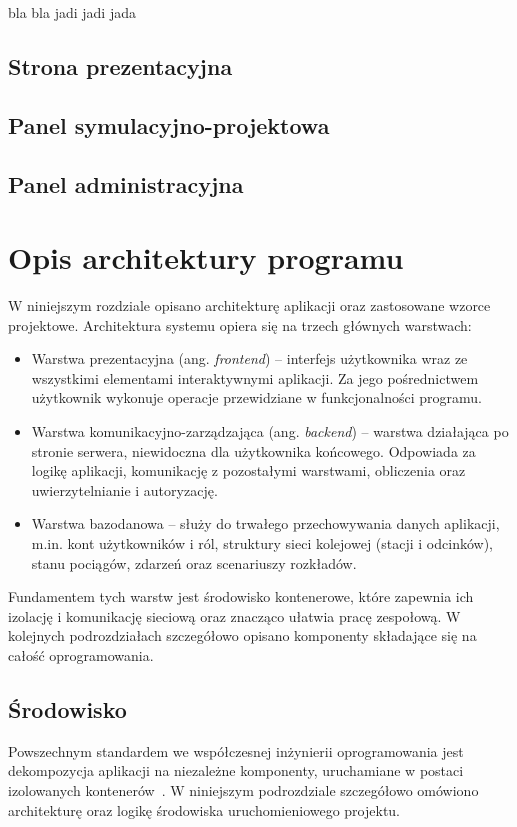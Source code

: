 \documentclass[twoside]{projektInzynierskiMS1z}
\begin{document}
bla bla jadi jadi jada
\subsection{Strona prezentacyjna} 
\subsection{Panel symulacyjno-projektowa}
\subsection{Panel administracyjna}

\section{Opis architektury programu}
W niniejszym rozdziale opisano architekturę aplikacji oraz zastosowane wzorce
projektowe. Architektura systemu opiera się na trzech głównych warstwach:
\begin{itemize}
    \item Warstwa prezentacyjna (ang. \emph{frontend}) -- interfejs użytkownika
    wraz ze wszystkimi elementami interaktywnymi aplikacji. Za jego
    pośrednictwem użytkownik wykonuje operacje przewidziane w funkcjonalności
    programu.
    \item Warstwa komunikacyjno-zarządzająca (ang. \emph{backend}) -- warstwa
    działająca po stronie serwera, niewidoczna dla użytkownika końcowego.
    Odpowiada za logikę aplikacji, komunikację z pozostałymi warstwami,
    obliczenia oraz uwierzytelnianie i autoryzację.
    \item Warstwa bazodanowa -- służy do trwałego przechowywania danych
    aplikacji, m.in. kont użytkowników i ról, struktury sieci kolejowej (stacji
    i odcinków), stanu pociągów, zdarzeń oraz scenariuszy rozkładów.
\end{itemize}
Fundamentem tych warstw jest środowisko kontenerowe, które zapewnia ich izolację
i komunikację sieciową oraz znacząco ułatwia pracę zespołową. W kolejnych
podrozdziałach szczegółowo opisano komponenty składające się na całość
oprogramowania.

\subsection{Środowisko}
Powszechnym standardem we współczesnej inżynierii oprogramowania jest dekompozycja aplikacji na niezależne komponenty, uruchamiane w postaci izolowanych kontenerów~\cite{kontener.microsoft}. W niniejszym podrozdziale szczegółowo omówiono architekturę oraz logikę środowiska uruchomieniowego projektu.
\end{document}
